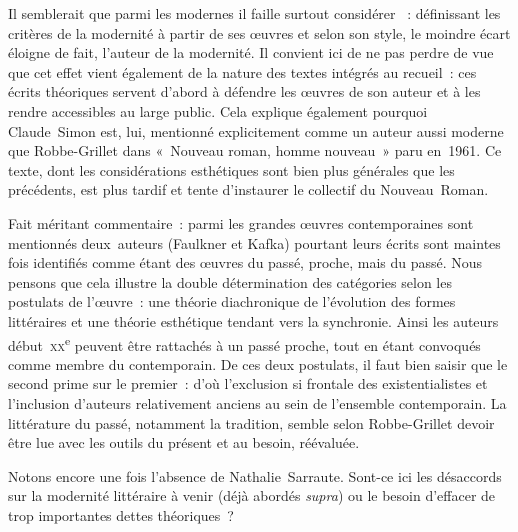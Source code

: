 Il semblerait que parmi les modernes il faille surtout considérer \robbe{}~: définissant les critères de la modernité à partir de ses œuvres et selon son style, le moindre écart éloigne de fait, l'auteur de la modernité. Il convient ici de ne pas perdre de vue que cet effet vient également de la nature des textes intégrés au recueil~: ces écrits théoriques servent d'abord à défendre les œuvres de son auteur et à les rendre accessibles au large public. Cela explique également pourquoi Claude~Simon est, lui, mentionné explicitement comme un auteur aussi moderne que Robbe-Grillet dans «~Nouveau roman, homme nouveau~» paru en~1961. Ce texte, dont les considérations esthétiques sont bien plus générales que les précédents, est plus tardif et tente d'instaurer le collectif du Nouveau~Roman.




Fait méritant commentaire~: parmi les grandes œuvres contemporaines sont mentionnés deux~auteurs (Faulkner et Kafka) pourtant leurs écrits sont maintes fois identifiés comme étant des œuvres du passé, proche, mais du passé. Nous pensons que cela illustre la double détermination des catégories selon les postulats de l'œuvre~: une théorie diachronique de l'évolution des formes littéraires et une théorie esthétique tendant vers la synchronie. Ainsi les auteurs début~\textsc{xx}\textsuperscript{e} peuvent être rattachés à un passé proche, tout en étant convoqués comme membre du contemporain. De ces deux postulats, il faut bien saisir que le second prime sur le premier~: d'où l'exclusion si frontale des existentialistes et l'inclusion d'auteurs relativement anciens au sein de l'ensemble contemporain. La littérature du passé, notamment la tradition, semble selon Robbe-Grillet devoir être lue avec les outils du présent et au besoin, réévaluée.




Notons encore une fois l'absence de Nathalie~Sarraute. Sont-ce ici les désaccords sur la modernité littéraire à venir (déjà abordés \textit{supra}) ou le besoin d'effacer de trop importantes dettes théoriques~?

